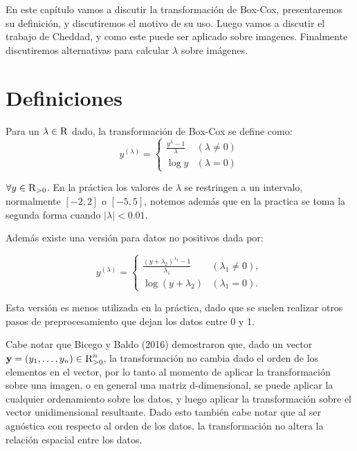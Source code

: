     En este cap\'itulo vamos a discutir la transformaci\'on de Box-Cox, presentaremos su definici\'on, y discutiremos el motivo de su uso. Luego vamos a discutir el trabajo de Cheddad\cite{boxcoximg}, y como este puede ser aplicado sobre imagenes. Finalmente discutiremos alternativas para calcular $\lambda$ sobre im\'agenes.
    
    \section{Definiciones}
    Para un $\lambda\in\textsc{R}$ dado, la transformaci\'on de Box-Cox se define como:
    \begin{equation}\label{Box-Cox}
        y^{(\lambda)}= \begin{cases}\frac{y^{\lambda}-1}{\lambda} & (\lambda \neq 0) \\ \log y & (\lambda=0)\end{cases}
    \end{equation}
    
    $\forall y\in\textsc{R}_{>0}$. En la pr\'actica los valores de $\lambda$ se restringen a un intervalo, normalmente $[-2,2]$ o $[-5,5]$, notemos adem\'as que en la practica se toma la segunda forma cuando $|\lambda|<0.01$\cite{boxcoximg}.
    
    Adem\'as existe una versi\'on para datos no positivos dada por:

    $$
    y^{(\lambda)}= \begin{cases}\frac{\left(y+\lambda_{2}\right)^{\lambda_{1}}-1}{\lambda_{1}} & \left(\lambda_{1} \neq 0\right), \\ \log \left(y+\lambda_{2}\right) & \left(\lambda_{1}=0\right) .\end{cases}
    $$

    Esta versi\'on es menos utilizada en la pr\'actica, dado que se suelen realizar otros pasos de preprocesamiento que dejan los datos entre 0 y 1.
    
    Cabe notar que Bicego y Baldo (2016)\cite{bicego2016} demostraron que, dado un vector $\textbf{y}=(y_1,\dots,y_n)\in\textsc{R}^n_{>0}$, la transformaci\'on no cambia dado el orden de los elementos en el vector, por lo tanto al momento de aplicar la transformaci\'on sobre una imagen, o en general una matriz d-dimensional, se puede aplicar la cualquier ordenamiento sobre los datos, y luego aplicar la transformaci\'on sobre el vector unidimensional resultante. Dado esto tambi\'en cabe notar que al ser agn\'ostica con respecto al orden de los datos, la transformaci\'on no altera la relaci\'on espacial entre los datos.
    
